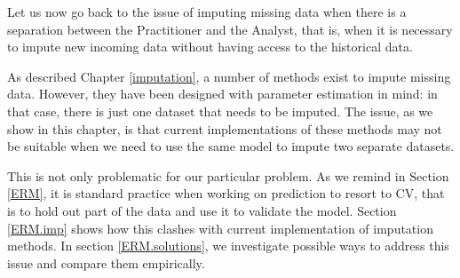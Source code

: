 Let us now go back to the issue of imputing missing data when there is a separation between the Practitioner and the Analyst, that is, when it is necessary to impute new incoming data without having access to the historical data.

As described Chapter \ref{imputation}, a number of methods exist to impute missing data. However, they have been designed with parameter estimation in mind: in that case, there is just one dataset that needs to be imputed. The issue, as we show in this chapter, is that current implementations of these methods may not be suitable when we need to use the same model to impute two separate datasets.

This is not only problematic for our particular problem. As we remind in Section \ref{ERM}, it is standard practice when working on prediction to resort to CV, that is to hold out part of the data and use it to validate the model. Section \ref{ERM.imp} shows how this clashes with current implementation of imputation methods. In section \ref{ERM.solutions}, we investigate possible ways to address this issue and compare them empirically.




